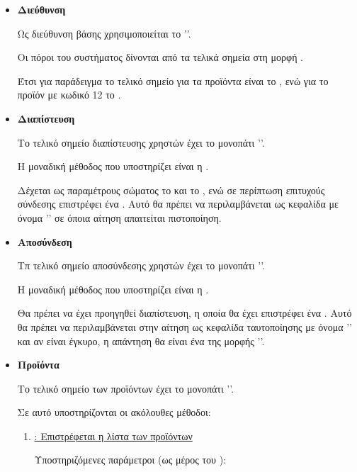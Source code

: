 \begin{itemize}
    \item \textbf{Διεύθυνση}
    
    Ως διεύθυνση βάσης χρησιμοποιείται το ''.

    Οι πόροι του συστήματος δίνονται από τα τελικά σημεία στη μορφή .

    Έτσι για παράδειγμα το τελικό σημείο για τα προϊόντα είναι το ,
    ενώ για το προϊόν με κωδικό 12 το .

    \item \textbf{Διαπίστευση} 
    
    Το τελικό σημείο διαπίστευσης χρηστών έχει το μονοπάτι ''.

    Η μοναδική μέθοδος που υποστηρίζει είναι η .

    Δέχεται ως παραμέτρους σώματος το  και το , 
    ενώ σε περίπτωση επιτυχούς σύνδεσης επιστρέφει ένα .
    Αυτό θα πρέπει να περιλαμβάνεται ως κεφαλίδα με όνομα ''
    σε όποια αίτηση απαιτείται πιστοποίηση.

    \item \textbf{Αποσύνδεση} 
    
    Τπ τελικό σημείο αποσύνδεσης χρηστών έχει το μονοπάτι ''.

    Η μοναδική μέθοδος που υποστηρίζει είναι η .
    
    Θα πρέπει να έχει προηγηθεί διαπίστευση,
    η οποία θα έχει επιστρέφει ένα .
    Αυτό θα πρέπει να περιλαμβάνεται στην αίτηση ως κεφαλίδα ταυτοποίησης με όνομα ''
    και αν είναι έγκυρο,
    η απάντηση θα είναι ένα  της μορφής ''.

    \item \textbf{Προϊόντα}
    
    Το τελικό σημείο των προϊόντων έχει το μονοπάτι ''.

    Σε αυτό υποστηρίζονται οι ακόλουθες μέθοδοι:

    \begin{enumerate}
        \item \underline{\textbf{}: Επιστρέφεται η λίστα των προϊόντων}
        
        Υποστηριζόμενες παράμετροι (ως μέρος του ):


\end{enumerate}
\end{itemize}
